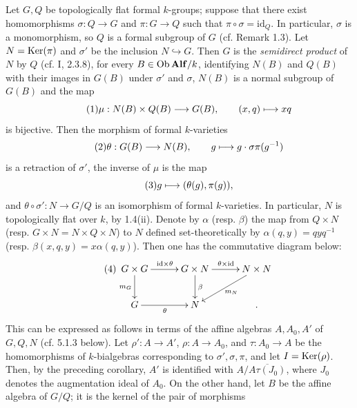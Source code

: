 Let $G,Q$ be topologically flat formal $k$-groups; suppose that there exist homomorphisms $\sigma:Q\to G$ and $\pi:G\to Q$ such that $\pi\circ\sigma=\mathrm{id}_Q$. In particular, $\sigma$ is a monomorphism, so $Q$ is a formal subgroup of $G$ (cf. Remark 1.3). Let $N=\operatorname{Ker}(\pi)$ and $\sigma'$ be the inclusion $N\hookrightarrow G$. Then $G$ is the \emph{semidirect product} of $N$ by $Q$ (cf. I, 2.3.8), \ie for every $B\in\operatorname{Ob}\mathbf{Alf}/k$, identifying $N(B)$ and $Q(B)$ with their images in $G(B)$ under $\sigma'$ and $\sigma$, $N(B)$ is a normal subgroup of $G(B)$ and the map
\begin{equation}\tag{1}
\mu:N(B)\times Q(B)\longrightarrow G(B),\qquad(x,q)\longmapsto xq
\end{equation}
is bijective. Then the morphism of formal $k$-varieties
\begin{equation}\tag{2}
\theta:G(B)\longrightarrow N(B),\qquad g\longmapsto g\cdot\sigma\pi(g^{-1})
\end{equation}
is a retraction of $\sigma'$, the inverse of $\mu$ is the map
\begin{equation}\tag{3}
g\longmapsto(\theta(g),\pi(g)),
\end{equation}
and $\theta\circ\sigma':N\to G/Q$ is an isomorphism of formal $k$-varieties. In particular, $N$ is topologically flat over $k$, by 1.4(ii).
Denote by $\alpha$ (resp. $\beta$) the map from $Q\times N$ (resp. $G\times N=N\times Q\times N$) to $N$ defined set-theoretically by $\alpha(q,y)=qyq^{-1}$ (resp. $\beta(x,q,y)=x\alpha(q,y)$). Then one has the commutative diagram below:
\begin{equation}\tag{4}
\xymatrix@C=28pt{
G\times G\ar[r]^{\mathrm{id}\times\theta}\ar[d]_{m_G}&G\times N\ar[r]^{\theta\times\mathrm{id}}\ar[d]^\beta&N\times N\ar[dl]^{m_N}\\
G\ar[r]_\theta&N&.}
\end{equation}
This can be expressed as follows in terms of the affine algebras $A,A_0,A'$ of $G,Q,N$ (cf. 5.1.3 below). Let $\rho':A\to A'$, $\rho:A\to A_0$, and $\tau:A_0\to A$ be the homomorphisms of $k$-bialgebras corresponding to $\sigma',\sigma,\pi$, and let $I=\operatorname{Ker}(\rho)$. Then, by the preceding corollary, $A'$ is identified with $A/\overline{A\tau(J_0)}$, where $J_0$ denotes the augmentation ideal of $A_0$.
On the other hand, let $B$ be the affine algebra of $G/Q$; it is the kernel of the pair of morphisms
